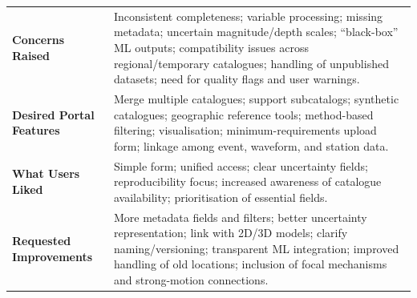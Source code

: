 \documentclass[11pt]{article}
\begin{document}
\begin{table}[H]
\begin{tabular}{p{3.2cm} p{11cm}}
\textbf{Concerns Raised} &
Inconsistent completeness; variable processing; missing metadata; uncertain magnitude/depth scales; ``black-box'' ML outputs; compatibility issues across regional/temporary catalogues; handling of unpublished datasets; need for quality flags and user warnings. \\[0.2cm]

\textbf{Desired Portal Features} &
Merge multiple catalogues; support subcatalogs; synthetic catalogues; geographic reference tools; method-based filtering; visualisation; minimum-requirements upload form; linkage among event, waveform, and station data. \\[0.2cm]

\textbf{What Users Liked} &
Simple form; unified access; clear uncertainty fields; reproducibility focus; increased awareness of catalogue availability; prioritisation of essential fields. \\[0.2cm]

\textbf{Requested Improvements} &
More metadata fields and filters; better uncertainty representation; link with 2D/3D models; clarify naming/versioning; transparent ML integration; improved handling of old locations; inclusion of focal mechanisms and strong-motion connections. \\
\bottomrule
\end{tabular}
\end{table}
\end{document}
